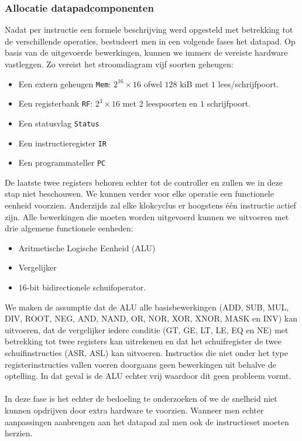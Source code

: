 \subsubsection{Allocatie datapadcomponenten}
Nadat per instructie een formele beschrijving werd opgesteld met betrekking tot de verschillende operaties, bestudeert men in een volgende fases het datapad. Op basis van de uitgevoerde bewerkingen, kunnen we immers de vereiste hardware vastleggen. Zo vereist het stroomdiagram vijf soorten geheugen:
\begin{itemize}
 \item 	Een extern geheugen \texttt{Mem}: $2^{16}\times 16$ ofwel $128\mbox{ kiB}$ met $1$ lees/schrijfpoort.
 \item Een registerbank \texttt{RF}: $2^3\times 16$ met $2$ leespoorten en $1$ schrijfpoort.
 \item Een statusvlag \texttt{Status}
 \item Een instructieregister \texttt{IR}
 \item Een programmateller \texttt{PC}
\end{itemize}
De laatste twee registers behoren echter tot de controller en zullen we in deze stap niet beschouwen. We kunnen verder voor elke operatie een functionele eenheid voorzien. Anderzijds zal elke klokcyclus er hoogstens \'e\'en instructie actief zijn. Alle bewerkingen die moeten worden uitgevoerd kunnen we uitvoeren met drie algemene functionele eenheden:
\begin{itemize}
 \item Aritmetische Logische Eenheid (ALU)
 \item Vergelijker
 \item $16$-bit bidirectionele schuifoperator.
\end{itemize}
We maken de assumptie dat de ALU alle basisbewerkingen (ADD, SUB, MUL, DIV, ROOT, NEG, AND, NAND, OR, NOR, XOR, XNOR, MASK en INV) kan uitvoeren, dat de vergelijker iedere conditie (GT, GE, LT, LE, EQ en NE) met betrekking tot twee registers kan uitrekenen en dat het schuifregister de twee schuifinstructies (ASR, ASL) kan uitvoeren. Instructies die niet onder het type registerinstructies vallen voeren doorgaans geen bewerkingen uit behalve de optelling. In dat geval is de ALU echter vrij waardoor dit geen probleem vormt.
\paragraph{}
In deze fase is het echter de bedoeling te onderzoeken of we de snelheid niet kunnen opdrijven door extra hardware te voorzien. Wanneer men echter aanpassingen aanbrengen aan het datapad zal men ook de instructieset moeten herzien.
